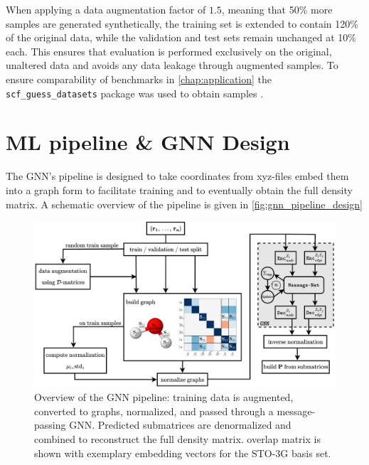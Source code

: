 When applying a data augmentation factor of $1.5$, meaning that 50\% more samples are generated synthetically, the training set is extended to contain 120\% of the original data, while the validation and test sets remain unchanged at 10\% each. This ensures that evaluation is performed exclusively on the original, unaltered data and avoids any data leakage through augmented samples. To ensure comparability of benchmarks in \autoref{chap:application} the \texttt{scf\_guess\_datasets} package was used to obtain samples \parencite{ref:milacher_scf_guess_datasets}.

\section{ML pipeline \& GNN Design}
\label{sec:gnn_design}
The GNN's pipeline is designed to take coordinates from xyz-files embed them into a graph form to facilitate training and to eventually obtain the full density matrix. A schematic overview of the pipeline is given in \autoref{fig:gnn_pipeline_design}

\begin{figure}[H]
    \centering
    \includegraphics[width=\textwidth]{../fig/gnn/GNN_design.pdf}
    \caption[GNN pipeline design]{Overview of the GNN pipeline: training data is augmented, converted to graphs, normalized, and passed through a message-passing GNN. Predicted submatrices are denormalized and combined to reconstruct the full density matrix.  overlap matrix is shown with exemplary embedding vectors for the STO-3G basis set.}
    \label{fig:gnn_pipeline_design}
\end{figure}

